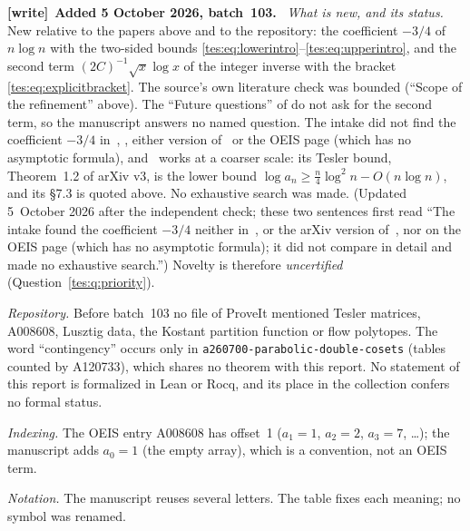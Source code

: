 \documentclass[11pt,a4paper]{article}
\theoremstyle{remark}\newtheorem{remark}[theorem]{Remark}
\numberwithin{equation}{section}
\newenvironment{writenote}[1][]{\par\smallskip\begingroup\small
 \noindent\textbf{[write]}\if\relax\detokenize{#1}\relax\else~\textbf{#1.}\fi\ }%
 {\par\endgroup\smallskip}
\begin{document}
\begin{writenote}[Added 5 October 2026, batch~103]
\emph{What is new, and its status.} New relative to the papers above and to
the repository: the coefficient $-3/4$ of $n\log n$ with the two-sided
bounds \eqref{tes:eq:lowerintro}--\eqref{tes:eq:upperintro}, and the second
term $(2C)^{-1}\sqrt x\log x$ of the integer inverse with the bracket
\eqref{tes:eq:explicitbracket}. The source's own literature check was
bounded (``Scope of the refinement'' above). The ``Future questions'' of
\cite[\S5]{bbm} do not ask for the second term, so the manuscript answers
no named question. The intake did not find the coefficient $-3/4$
in~\cite{bbm}, \cite{blp}, either version of~\cite{oneill} or the OEIS
page (which has no asymptotic formula), and~\cite{lm} works at a coarser
scale: its Tesler bound, Theorem~1.2 of arXiv v3, is the lower bound
$\log a_n\ge\frac n4\log^2n-O(n\log n)$, and its \S7.3 is quoted above. No
exhaustive search was made. (Updated 5~October 2026 after the independent
check; these two sentences first read ``The intake found the coefficient
$-3/4$ neither in~\cite{bbm}, \cite{blp} or the arXiv version
of~\cite{oneill}, nor on the OEIS page (which has no asymptotic formula);
it did not compare \cite[Theorem~1.2]{lm} in detail and made no exhaustive
search.'') Novelty is therefore \emph{uncertified}
(Question~\ref{tes:q:priority}).

\emph{Repository.} Before batch~103 no file of ProveIt mentioned Tesler
matrices, A008608, Lusztig data, the Kostant partition function or flow
polytopes. The word ``contingency'' occurs only in
\nolinkurl{a260700-parabolic-double-cosets} (tables counted by A120733),
which shares no theorem with this report. No statement of this report is
formalized in Lean or Rocq, and its place in the collection confers no
formal status.

\emph{Indexing.} The OEIS entry A008608 has offset~1 ($a_1=1$, $a_2=2$,
$a_3=7$, \ldots); the manuscript adds $a_0=1$ (the empty array), which is a
convention, not an OEIS term.

\emph{Notation.} The manuscript reuses several letters. The table fixes
each meaning; no symbol was renamed.


\end{writenote}
\end{document}
